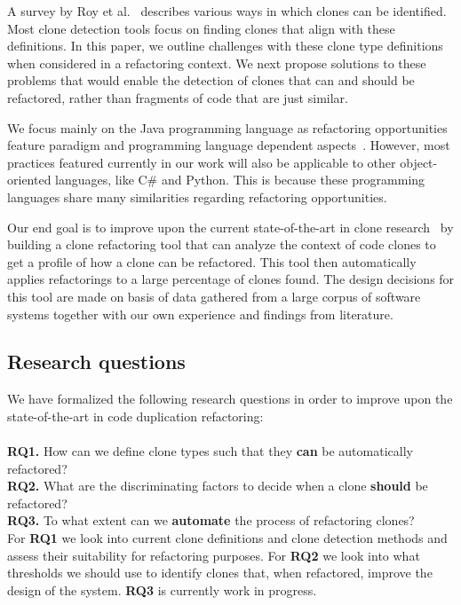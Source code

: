 \documentclass[a4paper]{article}
\begin{document}
A survey by Roy et al.~\cite{roy2007survey} describes various ways in which clones can be identified. Most clone detection tools focus on finding clones that align with these definitions. In this paper, we outline challenges with these clone type definitions when considered in a refactoring context. We next propose solutions to these problems that would enable the detection of clones that can and should be refactored, rather than fragments of code that are just similar.

We focus mainly on the Java programming language as refactoring opportunities feature paradigm and programming language dependent aspects~\cite{choi2011extracting}. However, most practices featured currently in our work will also be applicable to other object-oriented languages, like C\# and Python. This is because these programming languages share many similarities regarding refactoring opportunities.

Our end goal is to improve upon the current state-of-the-art in clone research~\cite{fontana2015duplicated, alwaqfi2017refactoring} by building a clone refactoring tool that can analyze the context of code clones to get a profile of how a clone can be refactored. This tool then automatically applies refactorings to a large percentage of clones found. The design decisions for this tool are made on basis of data gathered from a large corpus of software systems together with our own experience and findings from literature.

\subsection{Research questions}
We have formalized the following research questions in order to improve upon the state-of-the-art in code duplication refactoring:
\\\\
\textbf{RQ1.} How can we define clone types such that they \textbf{can} be automatically refactored?\\
\textbf{RQ2.} What are the discriminating factors to decide when a clone \textbf{should} be refactored?\\
\textbf{RQ3.} To what extent can we \textbf{automate} the process of refactoring clones?\\

For \textbf{RQ1} we look into current clone definitions and clone detection methods and assess their suitability for refactoring purposes. For \textbf{RQ2} we look into what thresholds we should use to identify clones that, when refactored, improve the design of the system. \textbf{RQ3} is currently work in progress.
\end{document}
